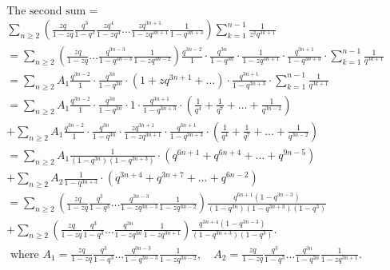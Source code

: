 \documentclass[draft]{amsart}
\numberwithin{equation}{section}
\theoremstyle{plain}
\theoremstyle{remark}
\begin{document}
\begin{align*}%
&\mbox{The second sum }=\\
&\sum_{n\geq 2}\left(\frac{zq}{1-zq}\frac{q^{3}}{1-q^{3}} \frac{zq^{4}}{1-zq^{4}}\dots\frac{zq^{3n+1}}{1-zq^{3n+1}}\frac{1}{1-q^{3n+3}}\right)\sum_{k=1}^{n-1}\frac{1}{z^{2}q^{3k+1}}\\
&=\sum_{n\geq 2}\left(\frac{zq}{1-zq}\dots\frac{q^{3n-3}}{1-q^{3n-3}}\frac{1}{1-zq^{3n-2}}\right)\frac{q^{3n-2}}{1}\cdot\frac{q^{3n}}{1-q^{3n}}\cdot\frac{1}{1-zq^{3n+1}}\cdot\frac{q^{3n+1}}{1-q^{3n+3}}\cdot\sum_{k=1}^{n-1}\frac{1}{q^{3k+1}}\\
&=\sum_{n\geq 2}A_{1}\frac{q^{3n-2}}{1}\cdot\frac{q^{3n}}{1-q^{3n}}\cdot(1+zq^{3n+1}+\dots)\cdot\frac{q^{3n+1}}{1-q^{3n+3}}\cdot\sum_{k=1}^{n-1}\frac{1}{q^{3k+1}}\\
&=\sum_{n\geq 2}A_{1}\frac{q^{3n-2}}{1}\cdot\frac{q^{3n}}{1-q^{3n}}\cdot1\cdot\frac{q^{3n+1}}{1-q^{3n+3}}\cdot\left(\frac{1}{q^{4}}    +\frac{1}{q^{7}}+\dots +\frac{1}{q^{3n-2}}
\right)\\
&+\sum_{n\geq 2}A_{1}\frac{q^{3n-2}}{1}\cdot\frac{q^{3n}}{1-q^{3n}}\cdot\frac{zq^{3n+1}}{1-zq^{3n+1}}\cdot\frac{q^{3n+1}}{1-q^{3n+3}}\cdot\left(\frac{1}{q^{4}}    +\frac{1}{q^{7}}+\dots +\frac{1}{q^{3n-2}}
\right)\\
&=\sum_{n\geq 2}A_{1}\frac{1}{(1-q^{3n})(1-q^{3n+3})}\cdot\left(q^{6n+1}   +q^{6n+4}+\dots +q^{9n-5}
\right)\\
&+\sum_{n\geq 2}A_{2}\frac{1}{1-q^{3n+3}}\cdot\left( q^{3n+4} +q^{3n+7}   +\dots+q^{6n-2}      \right)\\
&=\sum_{n\geq 2}\left(\frac{zq}{1-zq}\frac{q^{3}}{1-q^{3}}\dots\frac{q^{3n-3}}{1-zq^{3n-3}}\frac{1}{1-zq^{3n-2}}\right)\frac{q^{6n+1}(1-q^{3n-3})}{(1-q^{3n})(1-q^{3n+3})(1-q^{3})}    \\
&+\sum_{n\geq 2}\left(\frac{zq}{1-zq}\frac{q^{3}}{1-q^{3}}\dots\frac{q^{3n}}{1-zq^{3n}}\frac{1}{1-zq^{3n+1}}\right)\frac{q^{3n+4}(1-q^{3n-3})}{(1-q^{3n+3})(1-q^{3})}.   \\
&\mbox{ where }A_{1}=\frac{zq}{1-zq}\frac{q^{3}}{1-q^{3}} \dots\frac{q^{3n-3}}{1-q^{3n-3}}\frac{1}{1-zq^{3n-2}},\quad
A_{2}=\frac{zq}{1-zq}\frac{q^{3}}{1-q^{3}}\dots\frac{q^{3n}}{1-q^{3n}}\frac{1}{1-zq^{3n+1}}.
\end{align*}


\end{document}
